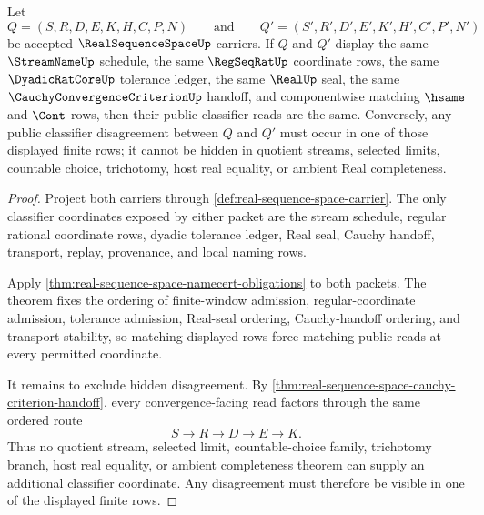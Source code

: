 \begin{theorem}
\label{thm:real-sequence-space-finite-window-classifier-determinacy}
Let
$$
Q=(S,R,D,E,K,H,C,P,N)
\qquad\text{and}\qquad
Q'=(S',R',D',E',K',H',C',P',N')
$$
be accepted $\RealSequenceSpaceUp$ carriers. If $Q$ and $Q'$ display the same $\StreamNameUp$ schedule, the same $\RegSeqRatUp$ coordinate rows, the same $\DyadicRatCoreUp$ tolerance ledger, the same $\RealUp$ seal, the same $\CauchyConvergenceCriterionUp$ handoff, and componentwise matching $\hsame$ and $\Cont$ rows, then their public classifier reads are the same. Conversely, any public classifier disagreement between $Q$ and $Q'$ must occur in one of those displayed finite rows; it cannot be hidden in quotient streams, selected limits, countable choice, trichotomy, host real equality, or ambient Real completeness.
\end{theorem}
\begin{proof}
Project both carriers through \autoref{def:real-sequence-space-carrier}. The only classifier coordinates exposed by either packet are the stream schedule, regular rational coordinate rows, dyadic tolerance ledger, Real seal, Cauchy handoff, transport, replay, provenance, and local naming rows.

Apply \autoref{thm:real-sequence-space-namecert-obligations} to both packets. The theorem fixes the ordering of finite-window admission, regular-coordinate admission, tolerance admission, Real-seal ordering, Cauchy-handoff ordering, and transport stability, so matching displayed rows force matching public reads at every permitted coordinate.

It remains to exclude hidden disagreement. By \autoref{thm:real-sequence-space-cauchy-criterion-handoff}, every convergence-facing read factors through the same ordered route
$$
S \longrightarrow R \longrightarrow D \longrightarrow E \longrightarrow K .
$$
Thus no quotient stream, selected limit, countable-choice family, trichotomy branch, host real equality, or ambient completeness theorem can supply an additional classifier coordinate. Any disagreement must therefore be visible in one of the displayed finite rows.
\end{proof}

